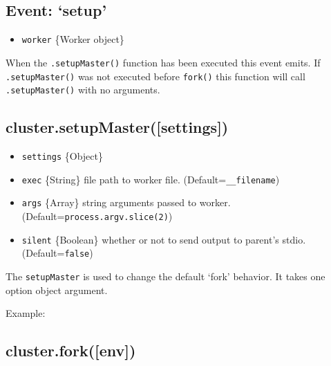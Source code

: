 \subsection{Event: `setup'}

\begin{itemize}
\item
  \texttt{worker} \{Worker object\}
\end{itemize}

When the \texttt{.setupMaster()} function has been executed this event
emits. If \texttt{.setupMaster()} was not executed before
\texttt{fork()} this function will call \texttt{.setupMaster()} with no
arguments.

\subsection{cluster.setupMaster({[}settings{]})}

\begin{itemize}
\item
  \texttt{settings} \{Object\}
\item
  \texttt{exec} \{String\} file path to worker file.
  (Default=\texttt{\_\_filename})
\item
  \texttt{args} \{Array\} string arguments passed to worker.
  (Default=\texttt{process.argv.slice(2)})
\item
  \texttt{silent} \{Boolean\} whether or not to send output to parent's
  stdio. (Default=\texttt{false})
\end{itemize}

The \texttt{setupMaster} is used to change the default `fork' behavior.
It takes one option object argument.

Example:

\begin{Shaded}
\begin{Highlighting}[]
 \NormalTok{);}
\NormalTok{(\{}
  \NormalTok{: }\NormalTok{,}
  \NormalTok{: [}\NormalTok{, }\NormalTok{],}
  \NormalTok{: }
\NormalTok{\});}
\NormalTok{();}
\end{Highlighting}
\end{Shaded}

\subsection{cluster.fork({[}env{]})}

